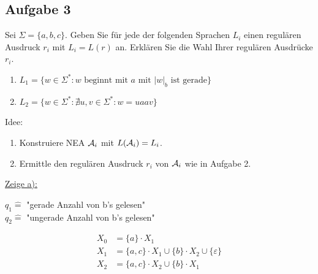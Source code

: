 \subsection{Aufgabe 3}
Sei $\Sigma=\lbrace a,b,c\rbrace$.
 Geben Sie für jede der folgenden Sprachen $L_i$ einen regulären Ausdruck $r_i$ mit $L_i=L(r)$ an.
Erklären Sie die Wahl Ihrer regulären Ausdrücke $r_i$.

\begin{enumerate}[label=\alph*)]
	\item $L_1=\big\lbrace w\in\Sigma^\ast:w\text{ beginnt mit $a$ mit $|w|_b$ ist gerade}\big\rbrace$
	\item $L_2=\big\lbrace w\in\Sigma^\ast:\nexists u,v\in\Sigma^\ast:w=uaav\big\rbrace$
\end{enumerate}

\begin{lösung}
	Idee: 
	\begin{enumerate}
		\item Konstruiere NEA $\mathcal{A}_i$ mit $L(\mathcal{A}_i)=L_i$.
		\item Ermittle den regulären Ausdruck $r_i$ von $\mathcal{A}_i$ wie in Aufgabe 2.
	\end{enumerate}		

	\underline{Zeige a):}
	
	\usetikzlibrary{positioning,automata}

	$q_1\hat{=}$ "gerade Anzahl von b's gelesen"\\
	$q_2\hat{=}$ "ungerade Anzahl von b's gelesen"
	
	\begin{align}
		X_0&=\lbrace a\rbrace\cdot X_1\\
		X_1&=\lbrace a,c\rbrace\cdot X_1\cup\lbrace b\rbrace\cdot X_2\cup\lbrace\varepsilon\rbrace\\
		X_2&=\lbrace a,c\rbrace\cdot X_2\cup\lbrace b\rbrace\cdot X_1
	\end{align}
	

\end{lösung}
